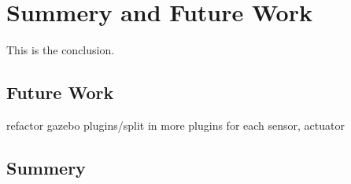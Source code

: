 \chapter{Summery and Future Work}
\label{cha:summery_and_future_work}

This is the conclusion.

\section{Future Work}

refactor gazebo plugins/split in more plugins for each sensor, actuator

\section{Summery}
